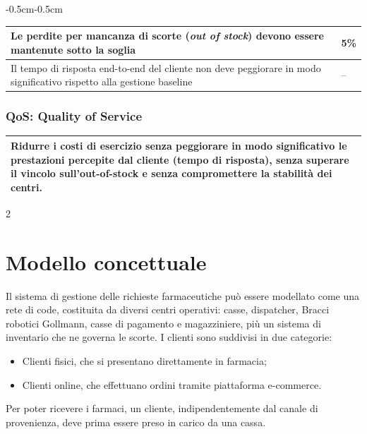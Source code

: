 \documentclass{article}
\begin{document}
\begin{adjustwidth}{-0.5cm}{-0.5cm}
\begin{table}[ht]
\centering
\begin{tabularx}{1\textwidth}{|X|>{\centering\arraybackslash}m{1.6cm}|}
  \hline
  Le perdite per mancanza di scorte (\emph{out of stock}) devono essere mantenute sotto la soglia & \vspace{1mm}5\%\vspace{1mm} \\
  \hline
  Il tempo di risposta end-to-end del cliente non deve peggiorare in modo significativo rispetto alla gestione baseline & \vspace{1mm}--\vspace{1mm} \\
  \hline
\end{tabularx}
\end{table}

\subsubsection*{QoS: Quality of Service}
\begin{table}[ht]
\centering
\begin{tabularx}{1\textwidth}{|X|}
  \hline
  Ridurre i costi di esercizio senza peggiorare in modo significativo le prestazioni percepite dal cliente (tempo di risposta), senza superare il vincolo sull'out-of-stock e senza compromettere la stabilità dei centri. \\
  \hline
\end{tabularx}
\end{table}
\newpage
\begin{multicols}{2}
\section{Modello concettuale}
Il sistema di gestione delle richieste farmaceutiche può essere modellato come una rete di code,
costituita da diversi centri operativi: casse, dispatcher, Bracci robotici Gollmann, casse di
pagamento e magazziniere, più un sistema di inventario che ne governa le scorte. I clienti sono
suddivisi in due categorie:
\begin{itemize}
    \item[\ding{112}]  Clienti fisici, che si presentano direttamente in farmacia;
    \item[\ding{112}]  Clienti online, che effettuano ordini tramite piattaforma e-commerce.
\end{itemize}

Per poter ricevere i farmaci, un cliente,  indipendentemente dal canale di provenienza,  deve
prima essere preso in carico da una cassa.


\end{multicols}
\end{adjustwidth}
\end{document}
